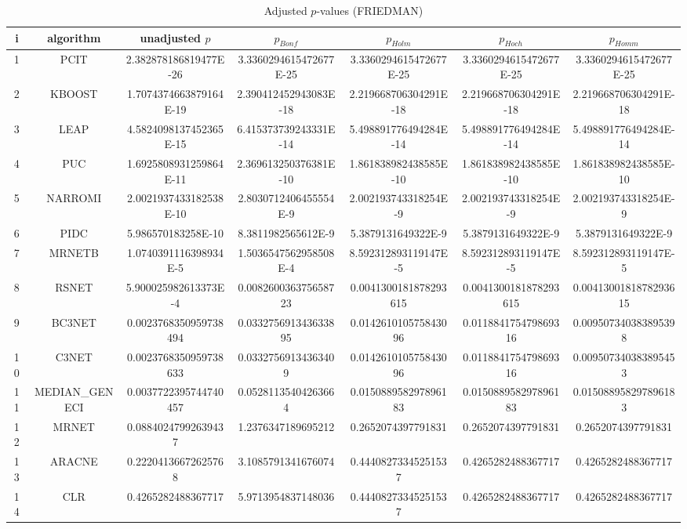 \documentclass[a4paper,10pt]{article}
\begin{document}
\begin{landscape}
\begin{table}[!htp]
\centering\scriptsize
\caption{Adjusted $p$-values (FRIEDMAN)}
\begin{tabular}{ccccccc}
i&algorithm&unadjusted $p$&$p_{Bonf}$&$p_{Holm}$&$p_{Hoch}$&$p_{Homm}$\\
\hline
1&PCIT&2.382878186819477E-26&3.3360294615472677E-25&3.3360294615472677E-25&3.3360294615472677E-25&3.3360294615472677E-25\\
2&KBOOST&1.7074374663879164E-19&2.390412452943083E-18&2.219668706304291E-18&2.219668706304291E-18&2.219668706304291E-18\\
3&LEAP&4.5824098137452365E-15&6.415373739243331E-14&5.498891776494284E-14&5.498891776494284E-14&5.498891776494284E-14\\
4&PUC&1.6925808931259864E-11&2.369613250376381E-10&1.861838982438585E-10&1.861838982438585E-10&1.861838982438585E-10\\
5&NARROMI&2.0021937433182538E-10&2.8030712406455554E-9&2.002193743318254E-9&2.002193743318254E-9&2.002193743318254E-9\\
6&PIDC&5.986570183258E-10&8.3811982565612E-9&5.3879131649322E-9&5.3879131649322E-9&5.3879131649322E-9\\
7&MRNETB&1.0740391116398934E-5&1.5036547562958508E-4&8.592312893119147E-5&8.592312893119147E-5&8.592312893119147E-5\\
8&RSNET&5.900025982613373E-4&0.008260036375658723&0.0041300181878293615&0.0041300181878293615&0.0041300181878293615\\
9&BC3NET&0.0023768350959738494&0.033275691343633895&0.014261010575843096&0.011884175479869316&0.009507340383895398\\
10&C3NET&0.0023768350959738633&0.03327569134363409&0.014261010575843096&0.011884175479869316&0.009507340383895453\\
11&MEDIAN_GENECI&0.0037722395744740457&0.05281135404263664&0.015088958297896183&0.015088958297896183&0.015088958297896183\\
12&MRNET&0.08840247992639437&1.2376347189695212&0.2652074397791831&0.2652074397791831&0.2652074397791831\\
13&ARACNE&0.22204136672625768&3.1085791341676074&0.44408273345251537&0.4265282488367717&0.4265282488367717\\
14&CLR&0.4265282488367717&5.9713954837148036&0.44408273345251537&0.4265282488367717&0.4265282488367717\\
\hline
\end{tabular}
\end{table}


\end{landscape}
\end{document}
